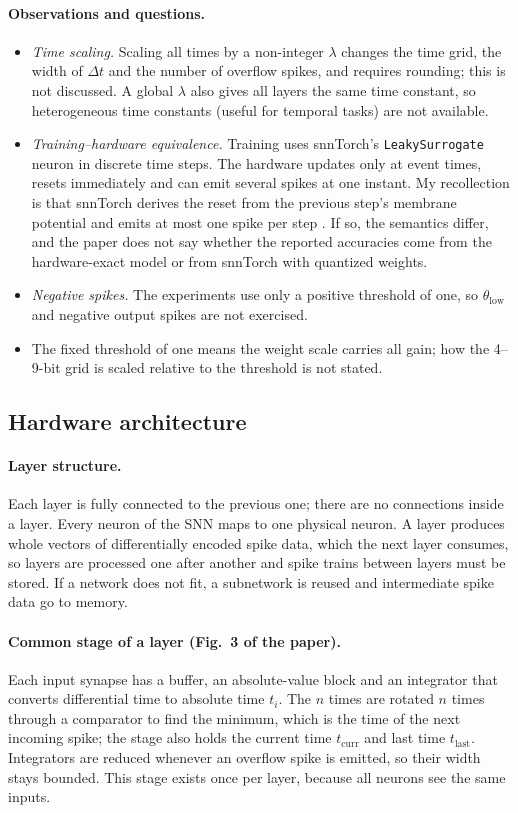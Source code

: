\paragraph{Observations and questions.}
\begin{itemize}[leftmargin=1.5em]
\item \emph{Time scaling.} Scaling all times by a non-integer $\lambda$ changes the time grid, the width of $\Delta t$ and the number of overflow spikes, and requires rounding; this is not discussed. A global $\lambda$ also gives all layers the same time constant, so heterogeneous time constants (useful for temporal tasks) are not available.
\item \emph{Training--hardware equivalence.} Training uses snnTorch's \texttt{LeakySurrogate} neuron in discrete time steps. The hardware updates only at event times, resets immediately and can emit several spikes at one instant. My recollection is that snnTorch derives the reset from the previous step's membrane potential and emits at most one spike per step . If so, the semantics differ, and the paper does not say whether the reported accuracies come from the hardware-exact model or from snnTorch with quantized weights.
\item \emph{Negative spikes.} The experiments use only a positive threshold of one, so $\theta_{\text{low}}$ and negative output spikes are not exercised.
\item The fixed threshold of one means the weight scale carries all gain; how the 4--9-bit grid is scaled relative to the threshold is not stated.
\end{itemize}

\subsection{Hardware architecture}
\paragraph{Layer structure.} Each layer is fully connected to the previous one; there are no connections inside a layer. Every neuron of the SNN maps to one physical neuron. A layer produces whole vectors of differentially encoded spike data, which the next layer consumes, so layers are processed one after another and spike trains between layers must be stored. If a network does not fit, a subnetwork is reused and intermediate spike data go to memory.

\paragraph{Common stage of a layer (Fig.~3 of the paper).} Each input synapse has a buffer, an absolute-value block and an integrator that converts differential time to absolute time $t_i$. The $n$ times are rotated $n$ times through a comparator to find the minimum, which is the time of the next incoming spike; the stage also holds the current time $t_\text{curr}$ and last time $t_\text{last}$. Integrators are reduced whenever an overflow spike is emitted, so their width stays bounded. This stage exists once per layer, because all neurons see the same inputs.

